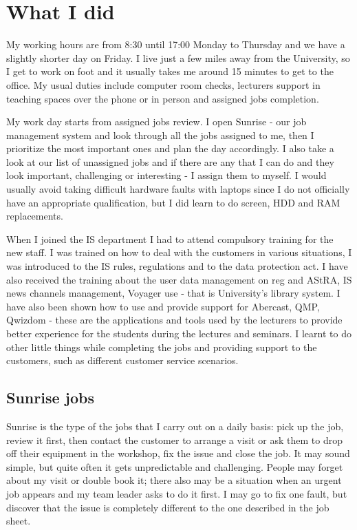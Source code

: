 \documentclass[10pt,a4paper,headinclude=true]{report}
\begin{document}
\chapter{What I did}
My working hours are from 8:30 until 17:00 Monday to Thursday and we have a slightly shorter day on Friday. I live just a few miles away from the University, so I get to work on foot and it usually takes me around 15 minutes to get to the office. My usual duties include computer room checks, lecturers support in teaching spaces over the phone or in person and assigned jobs completion.

My work day starts from assigned jobs review. I open Sunrise - our job management system and look through all the jobs assigned to me, then I prioritize the most important ones and plan the day accordingly. I also take a look at our list of unassigned jobs and if there are any that I can do and they look important, challenging or interesting - I assign them to myself. I would usually avoid taking difficult hardware faults with laptops since I do not officially have an appropriate qualification, but I did learn to do screen, HDD and RAM replacements. 

When I joined the IS department I had to attend compulsory training for the new staff. I was trained on how to deal with the customers in various situations, I was introduced to the IS rules, regulations and to the data protection act. I have also received the training about the user data management on reg and AStRA, IS news channels management, Voyager use - that is University's library system. I have also been shown how to use and provide support for Abercast, QMP, Qwizdom - these are the applications and tools used by the lecturers to provide better experience for the students during the lectures and seminars. I learnt to do other little things while completing the jobs and providing support to the customers, such as different customer service scenarios.

\section{Sunrise jobs}
Sunrise is the type of the jobs that I carry out on a daily basis: pick up the job, review it first, then contact the customer to arrange a visit or ask them to drop off their equipment in the workshop, fix the issue and close the job. It may sound simple, but quite often it gets unpredictable and challenging. People may forget about my visit or double book it; there also may be a situation when an urgent job appears and my team leader asks to do it first. I may go to fix one fault, but discover that the issue is completely different to the one described in the job sheet.
\end{document}
